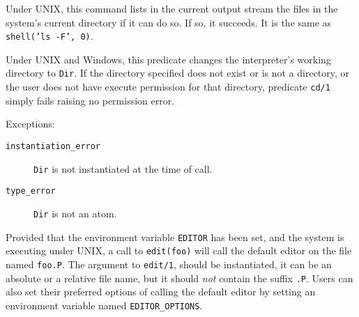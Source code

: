 \begin{description}

    Under UNIX, this command lists in the current output stream the files 
    in the system's current directory if it can do so.  If so, it succeeds.
    It is the same as {\tt shell('ls -F', 0)}.  

    Under UNIX and Windows, this predicate changes the interpreter's
    working directory to {\tt Dir}.  If the directory specified does
    not exist or is not a directory, or the user does not have execute
    permission for that directory, predicate {\tt cd/1} simply fails
    raising no permission error.

    Exceptions:
    \begin{description}
    \item[{\tt instantiation\_error}]
	{\tt Dir} is not instantiated at the time of call.
    \item[{\tt type\_error}]
	{\tt Dir} is not an atom.
    \end{description}

    Provided that the environment variable {\tt EDITOR} has been set,
    and the system is executing under UNIX, 
    a call to {\tt edit(foo)} will call the default editor on the file
    named {\tt foo.P}.  The argument to {\tt edit/1}, should be instantiated,
    it can be an absolute or a relative file name, but it should {\em not}
    contain the suffix {\tt .P}.  Users can also set their preferred options
    of calling the default editor by setting an environment variable named
    {\tt EDITOR\_OPTIONS}.


\end{description}
